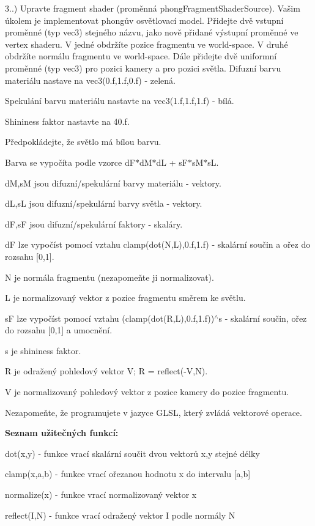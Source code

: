 \begin{DoxyRefList}
3..) Upravte fragment shader (proměnná phong\-Fragment\-Shader\-Source). Vašim úkolem je implementovat phongův osvětlovací model. Přidejte dvě vstupní proměnné (typ vec3) stejného názvu, jako nově přidané výstupní proměnné ve vertex shaderu. V jedné obdržíte pozice fragmentu ve world-\/space. V druhé obdržíte normálu fragmentu ve world-\/space. Dále přidejte dvě uniformní proměnné (typ vec3) pro pozici kamery a pro pozici světla. Difuzní barvu materiálu nastave na vec3(0.\-f,1.\-f,0.\-f) -\/ zelená.\par
 Spekulání barvu materiálu nastavte na vec3(1.\-f,1.\-f,1.\-f) -\/ bílá.\par
 Shininess faktor nastavte na 40.\-f.\par
 Předpokládejte, že světlo má bílou barvu.\par
 Barva se vypočíta podle vzorce d\-F$\ast$d\-M$\ast$d\-L + s\-F$\ast$s\-M$\ast$s\-L.\par
 d\-M,s\-M jsou difuzní/spekulární barvy materiálu -\/ vektory.\par
 d\-L,s\-L jsou difuzní/spekulární barvy světla -\/ vektory.\par
 d\-F,s\-F jsou difuzní/spekulární faktory -\/ skaláry.\par
 d\-F lze vypočíst pomocí vztahu clamp(dot(\-N,\-L),0.\-f,1.\-f) -\/ skalární součin a ořez do rozsahu \mbox{[}0,1\mbox{]}.\par
 N je normála fragmentu (nezapomeňte ji normalizovat).\par
 L je normalizovaný vektor z pozice fragmentu směrem ke světlu.\par
 s\-F lze vypočíst pomocí vztahu (clamp(dot(\-R,\-L),0.\-f,1.\-f))$^\wedge$s -\/ skalární součin, ořez do rozsahu \mbox{[}0,1\mbox{]} a umocnění.\par
 s je shininess faktor.\par
 R je odražený pohledový vektor V; R = reflect(-\/\-V,N).\par
 V je normalizovaný pohledový vektor z pozice kamery do pozice fragmentu.\par
 \par
 Nezapomeňte, že programujete v jazyce G\-L\-S\-L, který zvládá vektorové operace.\par
 {\bfseries Seznam užitečných funkcí\-:}
\begin{DoxyItemize}
\item dot(x,y) -\/ funkce vrací skalární součit dvou vektorů x,y stejné délky
\item clamp(x,a,b) -\/ funkce vrací ořezanou hodnotu x do intervalu \mbox{[}a,b\mbox{]}
\item normalize(x) -\/ funkce vrací normalizovaný vektor x
\item reflect(\-I,\-N) -\/ funkce vrací odražený vektor I podle normály N 
\end{DoxyItemize}


\end{DoxyRefList}
